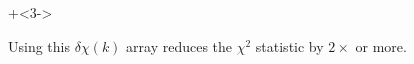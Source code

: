 \begin{frame}
\begin{columns}
\begin{column}[T]{60mm}
      {}

    \end{column}

\end{columns}

\vmm

{\onslide+<3-> {

\begin{cenpage}{105mm}

    Using this $\delta\chi(k)$ array reduces the $\chi^2$
    statistic by $2\times$ or  more.

\end{cenpage}

}}


\end{frame}

